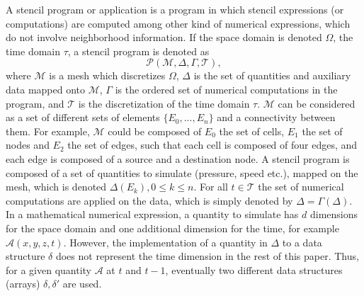 A stencil program or application is a program in which stencil expressions (or computations) are computed among other kind of numerical expressions, which do not involve neighborhood information. If the space domain is denoted $\Omega$, the time domain $\tau$, a stencil program is denoted as 
\begin{equation}
\mathcal{P}(\mathcal{M},\Delta,\Gamma,\mathcal{T}),
\end{equation}
where $\mathcal{M}$ is a mesh which discretizes $\Omega$, $\Delta$ is the set of quantities and auxiliary data mapped onto $\mathcal{M}$, $\Gamma$ is the ordered set of numerical computations in the program, and $\mathcal{T}$ is the discretization of the time domain $\tau$. $\mathcal{M}$ can be considered as a set of different sets of elements $\{E_0,...,E_n\}$ and a connectivity between them. For example, $\mathcal{M}$ could be composed of $E_0$ the set of cells, $E_1$ the set of nodes and $E_2$ the set of edges, such that each cell is composed of four edges, and each edge is composed of a source and a destination node. 
A stencil program is composed of a set of quantities to simulate (pressure, speed etc.), mapped on the mesh, which is denoted $\Delta(E_k), 0 \leq k \leq n$. For all $t \in \mathcal{T}$ the set of numerical computations are applied on the data, which is simply denoted by $\Delta=\Gamma(\Delta)$.%
In a mathematical numerical expression, a quantity to simulate has $d$ dimensions for the space domain and one additional dimension for the time, for example $\mathcal{A}(x,y,z,t)$. However, the implementation of a quantity in $\Delta$ to a data structure $\delta$ does not represent the time dimension in the rest of this paper. Thus, for a given quantity $\mathcal{A}$ at $t$ and $t-1$, eventually two different data structures (arrays) $\delta, \delta'$ are used. %

